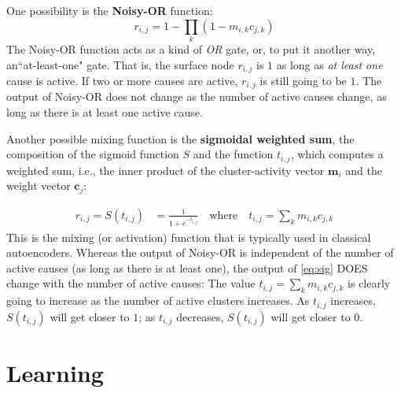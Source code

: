 One possibility is the \textbf{Noisy-OR} function:
 \begin{equation}\label{eq:noisy-or}
  r_{i,j} = 1 - \prod\limits_{k} (1 - m_{i,k} c_{j,k})
 \end{equation}
 The Noisy-OR function acts as a kind of \textit{OR} gate, or, to put it another way, an``at-least-one" gate. That is, the surface node $r_{i,j}$ is $1$ as long as \emph{at least one} cause is active.
 If two or more causes are active,
$r_{i,j}$ is still going to be $1$. The output of Noisy-OR does not change as the number of active causes change, as long as there is at least one active cause.

Another possible mixing function is the \textbf{sigmoidal weighted sum}, the composition of the sigmoid function $S$ and the function $t_{i,j}$, which computes a weighted sum, i.e., the inner product of the cluster-activity vector $\mathbf{m}_i$ and the weight vector $\mathbf{c}_j$:

	\begin{align} %
	\label{eq:sig}
	r_{i,j} = S(t_{i,j}) &= \frac{1}{1 + e^{-t_{i,j}}} \quad %
	\text{where} \quad t_{i,j} = \sum_k m_{i,k} c_{j,k}
	\end{align}
This is the mixing (or activation) function that is typically used in classical autoencoders. 
Whereas the output of Noisy-OR is independent of the number of active causes (as long as there is at least one), the output of \eqref{eq:sig} DOES change with the number of active causes: The value $t_{i,j} = \sum_k m_{i,k} c_{j,k}$ is clearly going to increase as the number of active clusters increases.
As $t_{i,j}$ increases, $S(t_{i,j})$ will get closer to $1$; as %
$t_{i,j}$ 
decreases, $S(t_{i,j})$ will get closer to $0$.


\section{Learning}
\label{ch4:sec:learning}

